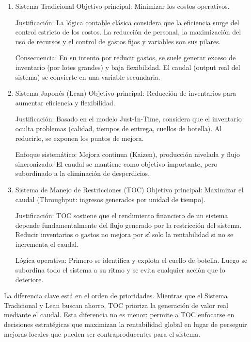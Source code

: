 \documentclass[a4paper,oneside,11pt]{article}
\begin{document}
\begin{enumerate}
    \item Sistema Tradicional
    Objetivo principal: Minimizar los costos operativos.
    
    Justificación: La lógica contable clásica considera que la eficiencia surge del control estricto de los costos. La reducción de personal, la maximización del uso de recursos y el control de gastos fijos y variables son sus pilares.
    
    Consecuencia: En su intento por reducir gastos, se suele generar exceso de inventario (por lotes grandes) y baja flexibilidad. El caudal (output real del sistema) se convierte en una variable secundaria.

    \item Sistema Japonés (Lean)
    Objetivo principal: Reducción de inventarios para aumentar eficiencia y flexibilidad.
    
    Justificación: Basado en el modelo Just-In-Time, considera que el inventario oculta problemas (calidad, tiempos de entrega, cuellos de botella). Al reducirlo, se exponen los puntos de mejora.
    
    Enfoque sistemático: Mejora continua (Kaizen), producción nivelada y flujo sincronizado. El caudal se mantiene como objetivo importante, pero subordinado a la eliminación de desperdicios.

    \item Sistema de Manejo de Restricciones (TOC)
    Objetivo principal: Maximizar el caudal (Throughput: ingresos generados por unidad de tiempo).

    Justificación: TOC sostiene que el rendimiento financiero de un sistema depende fundamentalmente del flujo generado por la restricción del sistema. Reducir inventarios o gastos no mejora por sí solo la rentabilidad si no se incrementa el caudal.
    
    Lógica operativa: Primero se identifica y explota el cuello de botella. Luego se subordina todo el sistema a su ritmo y se evita cualquier acción que lo deteriore.
\end{enumerate}

La diferencia clave está en el orden de prioridades. Mientras que el Sistema Tradicional y Lean buscan ahorro, TOC prioriza la generación de valor real mediante el caudal. Esta diferencia no es menor: permite a TOC enfocarse en decisiones estratégicas que maximizan la rentabilidad global en lugar de perseguir mejoras locales que pueden ser contraproducentes para el sistema.
\end{document}
